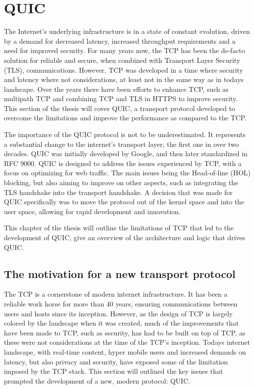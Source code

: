 \documentclass[english, 12pt, a4paper, elec, utf8, a-2b, online]{aaltothesis}
\begin{document}
\clearpage

\section{QUIC}
The Internet's underlying infrastructure is in a state of constant evolution,
driven by a demand for decreased latency, increased throughput requirements and
a need for improved security. For many years now, the TCP has been the de-facto
solution for reliable and secure, when combined with Transport Layer Security (TLS), communications. However,
TCP was developed in a time where security and latency where not considerations,
at least not in the same way as in todays landscape. Over the years there have
been efforts to enhance TCP, such as multipath TCP\cite{rfc8684} and combining
TCP and TLS in HTTPS\cite{rfc2818} to improve security. This section of the thesis
will cover QUIC, a transport protocol developed to overcome the limitations and
improve the performance as compared to the TCP\cite{quic_transport_protocol_design}.

The importance of the QUIC protocol is not to be underestimated. It represents
a substantial change to the internet's transport layer, the first one in over
two decades. QUIC was initially developed by Google, and then later standardized
in RFC 9000\cite{rfc9000}. QUIC is designed to address the issues experienced
by TCP, with a focus on optimizing for web traffic. The main issues being the
Head-of-line (HOL) blocking, but also aiming to improve on other aspects,
such as integrating the TLS handshake into the transport handshake. A decision
that was made for QUIC specifically was to move the protocol out of the kernel
space and into the user space, allowing for rapid development and innovation\cite{quic_transport_protocol_design}.

This chapter of the thesis will outline the limitations of TCP that led to the
development of QUIC, give an overview of the architecture and logic that drives
QUIC.
\subsection{The motivation for a new transport protocol \label{quic_motivation}}
The TCP is a cornerstone of modern internet infrastructure. It has been a reliable
work horse for more than 40 years, ensuring communications between users and hosts
since its inception. However, as the design of TCP is largely colored by the
landscape when it was created, much of the improvements that have been made to TCP,
such as security, has had to be built on top of TCP, as these were not considerations
at the time of the TCP's inception. Todays internet landscape, with real-time content,
hyper mobile users and increased demands on latency, but also privacy and security, have exposed
some of the limitation imposed by the TCP stack. This section will outlined the
key issues that prompted the development of a new, modern protocol: QUIC.
\end{document}
